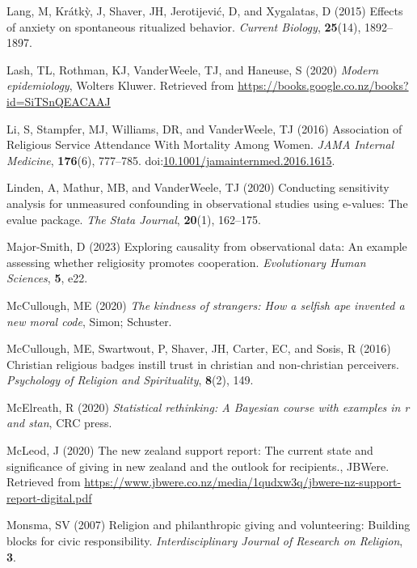 \documentclass[
  single column]{article}
\newlength{\cslhangindent}
\newenvironment{CSLReferences}[2] %
 {\begin{list}{}{%
  \setlength{\itemindent}{0pt}
  \setlength{\leftmargin}{0pt}
  \setlength{\parsep}{0pt}
  \ifodd #1
   \setlength{\leftmargin}{\cslhangindent}
   \setlength{\itemindent}{-1\cslhangindent}
  \fi
  \setlength{\itemsep}{#2\baselineskip}}}
 {\end{list}}
\begin{document}
\begin{CSLReferences}{1}{0}
Lang, M, Krátkỳ, J, Shaver, JH, Jerotijević, D, and Xygalatas, D (2015)
Effects of anxiety on spontaneous ritualized behavior. \emph{Current
Biology}, \textbf{25}(14), 1892--1897.

Lash, TL, Rothman, KJ, VanderWeele, TJ, and Haneuse, S (2020)
\emph{Modern epidemiology}, Wolters Kluwer. Retrieved from
\url{https://books.google.co.nz/books?id=SiTSnQEACAAJ}

Li, S, Stampfer, MJ, Williams, DR, and VanderWeele, TJ (2016)
{Association of Religious Service Attendance With Mortality Among
Women}. \emph{JAMA Internal Medicine}, \textbf{176}(6), 777--785.
doi:\href{https://doi.org/10.1001/jamainternmed.2016.1615}{10.1001/jamainternmed.2016.1615}.

Linden, A, Mathur, MB, and VanderWeele, TJ (2020) Conducting sensitivity
analysis for unmeasured confounding in observational studies using
e-values: The evalue package. \emph{The Stata Journal}, \textbf{20}(1),
162--175.

Major-Smith, D (2023) Exploring causality from observational data: An
example assessing whether religiosity promotes cooperation.
\emph{Evolutionary Human Sciences}, \textbf{5}, e22.

McCullough, ME (2020) \emph{The kindness of strangers: How a selfish ape
invented a new moral code}, Simon; Schuster.

McCullough, ME, Swartwout, P, Shaver, JH, Carter, EC, and Sosis, R
(2016) Christian religious badges instill trust in christian and
non-christian perceivers. \emph{Psychology of Religion and
Spirituality}, \textbf{8}(2), 149.

McElreath, R (2020) \emph{Statistical rethinking: A {B}ayesian course
with examples in r and stan}, CRC press.

McLeod, J (2020) The new zealand support report: The current state and
significance of giving in new zealand and the outlook for recipients.,
JBWere. Retrieved from
\url{https://www.jbwere.co.nz/media/1qudxw3q/jbwere-nz-support-report-digital.pdf}

Monsma, SV (2007) Religion and philanthropic giving and volunteering:
Building blocks for civic responsibility. \emph{Interdisciplinary
Journal of Research on Religion}, \textbf{3}.


\end{CSLReferences}
\end{document}

